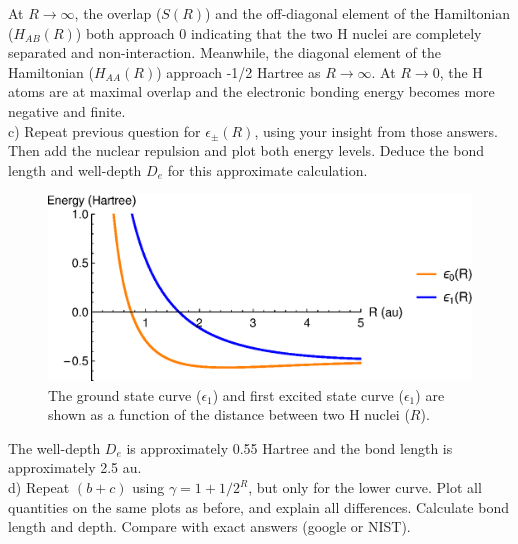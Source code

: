 \documentclass{article}
\begin{document}
{\color{blue}
  At $R\rightarrow \infty$, the overlap ($S(R)$) and the off-diagonal element of the
  Hamiltonian ($H_{AB}(R)$) both approach 0 indicating that the two H nuclei are completely
  separated and non-interaction. Meanwhile, the diagonal element of the Hamiltonian
  ($H_{AA}(R)$) approach -1/2 Hartree as $R\rightarrow\infty$. At $R\rightarrow 0$,
  the H atoms are at maximal overlap and the electronic bonding energy becomes more negative
  and finite.}
\\

\noindent c) Repeat previous question for $\epsilon_{\pm}(R)$, using your insight from
those answers. Then add the nuclear repulsion and plot both energy levels. Deduce the
bond length and well-depth $D_e$ for this approximate calculation.

\begin{figure}[H]
  \centering 
  \includegraphics[scale=0.75]{h2_cat_curve.eps}
  \caption{The ground state curve ($\epsilon_1$) and first excited
    state curve ($\epsilon_1$) are shown as a function of
    the distance between two H nuclei ($R$).}
  \label{fig:cat_curve}
\end{figure}

{\color{blue}
  The well-depth $D_e$ is approximately 0.55 Hartree and the bond
  length is approximately 2.5 au.}
\\

\noindent d) Repeat $(b+c)$ using $\gamma = 1 + 1/2^R$, but only for the lower curve.
Plot all quantities on the same plots as before, and explain all differences. Calculate
bond length and depth. Compare with exact answers (google or NIST).
\end{document}
